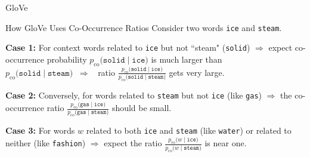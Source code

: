 \begin{frame}{GloVe}
\vspace{30pt}



\begin{exampleBlock}{How GloVe Uses Co-Occurrence Ratios \footnotemark}
Consider two words \texttt{ice} and \texttt{steam}. 

\begin{itemizeSpaced}{0pt}
    \item \textbf{Case 1:} For context words related to \texttt{ice} but not ``steam" (\texttt{solid}) $\Rightarrow$ expect co-occurrence probability $p_{\text{co}} \Big( \texttt{solid} \; | \; \texttt{ice} \Big)$ is much larger than $p_{\text{co}} \Big( \texttt{solid} \; | \; \texttt{steam} \Big)  \;\; \Rightarrow \;\; $ ratio $\frac {p_{\text{co}} \Big( \texttt{solid} \; | \; \texttt{ice} \Big)} {p_{\text{co}} \Big( \texttt{solid} \; | \; \texttt{steam} \Big)}$ gets very large.

    \item \textbf{Case 2: } Conversely, for words related to \texttt{steam} but not \texttt{ice} (like \texttt{gas}) $\Rightarrow$ the co-occurrence ratio $\frac {p_{\text{co}} \Big( \texttt{gas} \; | \; \texttt{ice} \Big)} {p_{\text{co}} \Big( \texttt{gas} \; | \; \texttt{steam} \Big)}$ should be small. 

    \item \textbf{Case 3:} For words $w$ related to both \texttt{ice} and \texttt{steam} (like \texttt{water}) or related to neither (like \texttt{fashion}) $\Rightarrow$ expect the ratio $\frac {p_{\text{co}} \Big( w \; | \; \texttt{ice} \Big)} {p_{\text{co}} \Big( w \; | \; \texttt{steam} \Big)}$ is near one. 
\end{itemizeSpaced}
\end{exampleBlock}




\end{frame}



